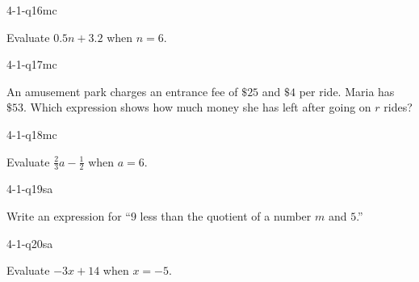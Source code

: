 \begin{practiceQuestion}{4-1-q16}{mc}
\begin{questionText}
Evaluate $0.5n + 3.2$ when $n = 6$.
\end{questionText}
\end{practiceQuestion}

\begin{practiceQuestion}{4-1-q17}{mc}
\begin{questionText}
An amusement park charges an entrance fee of $\$25$ and $\$4$ per ride. Maria has $\$53$. Which expression shows how much money she has left after going on $r$ rides?
\end{questionText}
\end{practiceQuestion}

\begin{practiceQuestion}{4-1-q18}{mc}
\begin{questionText}
Evaluate $\frac{2}{3}a - \frac{1}{2}$ when $a = 6$.
\end{questionText}
\end{practiceQuestion}


\begin{practiceQuestion}{4-1-q19}{sa}
\begin{questionText}
Write an expression for ``$9$ less than the quotient of a number $m$ and $5$.''
\end{questionText}
\end{practiceQuestion}

\begin{practiceQuestion}{4-1-q20}{sa}
\begin{questionText}
Evaluate $-3x + 14$ when $x = -5$.
\end{questionText}
\end{practiceQuestion}

